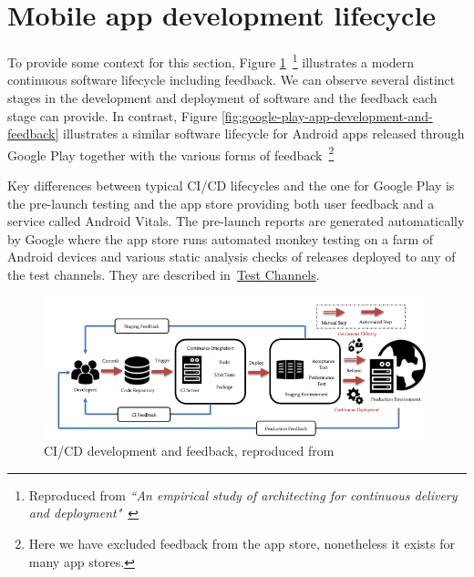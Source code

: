 \section{Mobile app development lifecycle}
To provide some context for this section, Figure \ref{fig:ci-cd-development-and-feedback}~\footnote{Reproduced from \emph{``An empirical study of architecting for continuous delivery and deployment"}~\cite{shahin2019empirical_study_architecting_cd}}
illustrates a modern continuous software lifecycle including feedback. We can observe several distinct stages in the development and deployment of software and the feedback each stage can provide. %
%
In contrast, Figure \ref{fig:google-play-app-development-and-feedback} illustrates a similar software lifecycle for Android apps released through Google Play together with the various forms of feedback~\footnote{Here we have excluded feedback from the app store, nonetheless it exists for many app stores.} 

Key differences between typical CI/CD lifecycles and the one for Google Play is the pre-launch testing and the app store providing both user feedback and a service called Android Vitals. The pre-launch reports are generated automatically by Google where the app store runs automated monkey testing on a farm of Android devices and various static analysis checks of releases deployed to any of the test channels. They are described in~\href{subsection-test-channels}{Test Channels}. %


\begin{figure}[htbp!]
    \centering
    \includegraphics[width=13cm]{images/ci-cd-development-and-feedback.png}
    \caption{CI/CD development and feedback, reproduced from~\cite{shahin2019empirical_study_architecting_cd}}
    \label{fig:ci-cd-development-and-feedback}
\end{figure}

